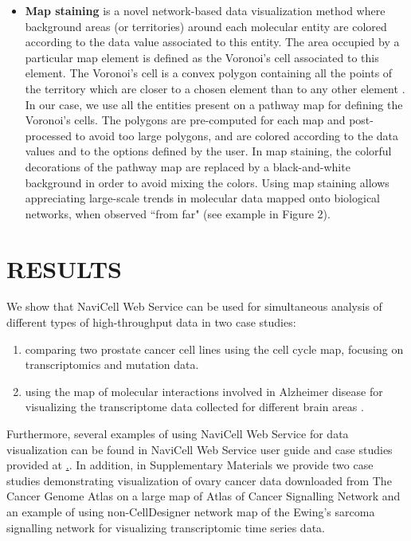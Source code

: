 \documentclass[a4,center,fleqn]{NAR}
\begin{document}
\begin{itemize}
\item \textbf{Map staining} is a novel network-based data visualization method where
background areas (or territories) around each molecular entity are colored according to the data
value associated to this entity. The area occupied by a particular map element is defined as the Voronoi's cell
associated to this element. The Voronoi's cell is a convex polygon containing all the points
of the territory which are closer to a chosen element than to any other element
\cite{aurenhammer1991voronoi}. In our case, we use all the entities present on a pathway map
for defining the Voronoi's cells. The polygons are pre-computed for each map and post-processed
to avoid too large polygons, and are colored according to the data values and to the options
defined by the user. In map staining, the colorful decorations of the pathway map
are replaced by a black-and-white background in order to avoid mixing the colors.
Using map staining allows appreciating large-scale trends in molecular data mapped
onto biological networks, when observed ``from far" (see example in Figure 2).

\end{itemize}



\section{RESULTS}

We show that NaviCell Web Service can be used for simultaneous analysis of
different types of high-throughput data in two case studies:
\begin{enumerate}
\item comparing two prostate cancer cell lines using the cell cycle map,
focusing on transcriptomics and mutation data.

\item using the map of molecular interactions involved in Alzheimer disease
\cite{Mizuno2012} for visualizing the transcriptome data collected for
different brain areas \cite{Hokama2014}.
\end{enumerate}

Furthermore, several examples of using NaviCell Web Service for data
visualization can be found in NaviCell Web Service user guide and case studies
provided at \href{http://navicell.curie.fr/pages/nav\_web\_service.html}.. In addition, in Supplementary
Materials we provide two case studies demonstrating visualization of ovary cancer data downloaded from The Cancer Genome
Atlas \cite{TCGA2011Ovarian} on a large map of Atlas of Cancer Signalling
Network \cite{Kuperstein2015} and an example of using non-CellDesigner network map
of the Ewing's sarcoma signalling network \cite{Stoll2013} for visualizing transcriptomic time series data.
\end{document}
